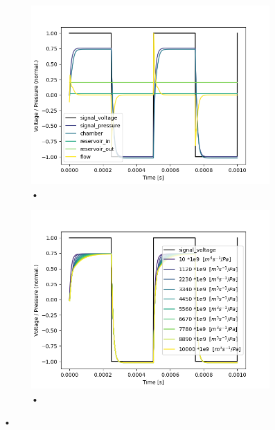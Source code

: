 \documentclass[fontsize=12pt, a4paper]{scrartcl}
\begin{document}
\begin{figure}[H]
	\centering
	\begin{subfigure}[H]{0.48\textwidth}
		\includegraphics[width=\textwidth, valign=t]{bilder/velveresistance/vr_in_branch_singlesweep.png}
		\caption{•}
	\end{subfigure}
	\begin{subfigure}[H]{0.48\textwidth}
		\includegraphics[width=\textwidth, valign=t]{bilder/velveresistance/vr_in_branch_multisweep.png}
		\caption{•}
	\end{subfigure}
	\caption{•}
\end{figure}
\end{document}
